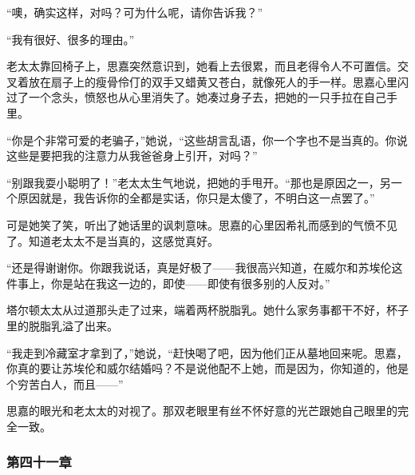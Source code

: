 \par “噢，确实这样，对吗？可为什么呢，请你告诉我？”
\par “我有很好、很多的理由。”
\par 老太太靠回椅子上，思嘉突然意识到，她看上去很累，而且老得令人不可置信。交叉着放在扇子上的瘦骨伶仃的双手又蜡黄又苍白，就像死人的手一样。思嘉心里闪过了一个念头，愤怒也从心里消失了。她凑过身子去，把她的一只手拉在自己手里。
\par “你是个非常可爱的老骗子，”她说，“这些胡言乱语，你一个字也不是当真的。你说这些是要把我的注意力从我爸爸身上引开，对吗？”
\par “别跟我耍小聪明了！”老太太生气地说，把她的手甩开。“那也是原因之一，另一个原因就是，我告诉你的全都是实话，你只是太傻了，不明白这一点罢了。”
\par 可是她笑了笑，听出了她话里的讽刺意味。思嘉的心里因希礼而感到的气愤不见了。知道老太太不是当真的，这感觉真好。
\par “还是得谢谢你。你跟我说话，真是好极了——我很高兴知道，在威尔和苏埃伦这件事上，你是站在我这一边的，即使——即使有很多别的人反对。”
\par 塔尔顿太太从过道那头走了过来，端着两杯脱脂乳。她什么家务事都干不好，杯子里的脱脂乳溢了出来。
\par “我走到冷藏室才拿到了，”她说，“赶快喝了吧，因为他们正从墓地回来呢。思嘉，你真的要让苏埃伦和威尔结婚吗？不是说他配不上她，而是因为，你知道的，他是个穷苦白人，而且——”
\par 思嘉的眼光和老太太的对视了。那双老眼里有丝不怀好意的光芒跟她自己眼里的完全一致。

\subsubsection{第四十一章}

